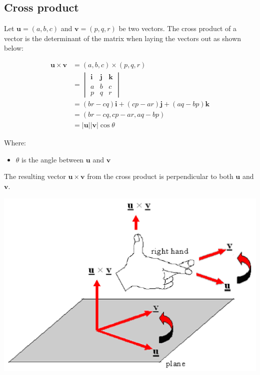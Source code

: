 \documentclass[11pt]{article}
\begin{document}
 \newpage
\subsection{Cross product}
\label{sec:orgfadfea7}
Let \(\boldsymbol{u} = (a, b, c)\) and \(\boldsymbol{v} = (p, q, r)\) be two vectors. The cross product of a vector is the determinant of the matrix when laying the vectors out as shown below:

\begin{align*}
\boldsymbol{u} \times \boldsymbol{v}
&= (a, b, c) \times (p, q, r) \\
&= \begin{vmatrix}
\boldsymbol{i} & \boldsymbol{j} & \boldsymbol{k} \\
a & b & c \\
p & q & r
\end{vmatrix} \\
&= (br - cq) \boldsymbol{i} + (cp - ar) \boldsymbol{j} + (aq - bp) \boldsymbol{k} \\
&= (br - cq, cp - ar, aq - bp) \\
&= |\boldsymbol{u}| |\boldsymbol{v}| \cos \theta
\end{align*}

Where:
\begin{itemize}
\item \(\theta\) is the angle between \(\boldsymbol{u}\) and \(\boldsymbol{v}\)
\end{itemize}

The resulting vector \(\boldsymbol{u} \times \boldsymbol{v}\) from the cross product is perpendicular to both \(\boldsymbol{u}\) and \(\boldsymbol{v}\).

\begin{center}
\includegraphics[width=.9\linewidth]{./images/cross-product-right-hand-rule.png}
\end{center}
\end{document}
